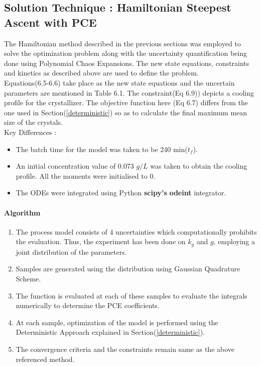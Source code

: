 \documentclass[3p,times,authoryear]{elsarticle}
\begin{document}
\subsection{Solution Technique : Hamiltonian Steepest Ascent with PCE}

The Hamiltonian method described in the previous sections was employed to solve the optimization problem along with the uncertainty quantification being done using Polynomial Chaos Expansions. The new state equations, constraints and kinetics as described above are used to define the problem.\\
Equations(6.5-6.6) take place as the new state equations and the uncertain parameters are mentioned in Table 6.1. The constraint(Eq 6.9)) depicts a cooling profile for the crystallizer. The objective function here (Eq 6.7) differs from the one used in Section(\ref{deterministic}) so as to calculate the final maximum mean size of the crystals.\\ 
Key Differences :
\begin{itemize}
\item The batch time for the model was taken to be 240 min($t_{f}$).
\item An initial concentration value of 0.073 $g/L$ was taken to obtain the cooling profile. All the moments were initialised to 0.
\item The ODEs were integrated using Python \textbf{scipy's} \textbf{odeint} integrator.
\end{itemize}

\paragraph{Algorithm}
\begin{enumerate}
\item The process model consists of 4 uncertainties which computationally prohibits the evaluation. Thus, the experiment has been done on $k_{g}$ and $g$, employing a joint distribution of the parameters.
\item Samples are generated using the distribution using Gaussian Quadrature Scheme.
\item The function is evaluated at each of these samples to evaluate the integrals numerically to determine the PCE coefficients.
\item At each sample, optimization of the model is performed using the Deterministic Approach explained in Section(\ref{deterministic}).
\item The convergence criteria and the constraints remain same as the above referenced method.
\end{enumerate}
\end{document}
